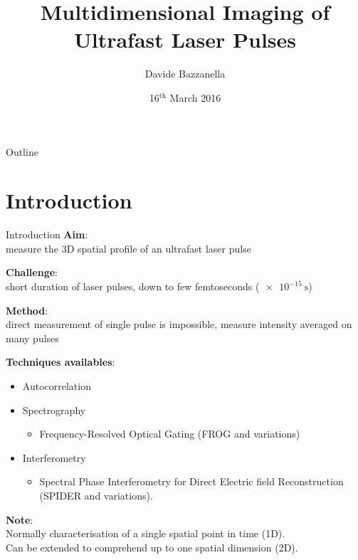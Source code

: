 \documentclass[11pt]{beamer}
\author{Davide Bazzanella}
\title{Multidimensional Imaging of Ultrafast Laser Pulses}
\institute{Imperial College London}
\date{16$^{\mathrm{th}}$ March 2016}
\begin{document}
\begin{frame}
\titlepage
\end{frame}

\begin{frame}{Outline}
\tableofcontents
\end{frame}

\section{Introduction}
\begin{frame}{Introduction}
\textbf{Aim}:\\
	measure the 3D spatial profile of an ultrafast laser pulse

	\vspace{15pt}
\textbf{Challenge}:\\
	short duration of laser pulses, down to few femtoseconds ($\SI{e-15}{\s}$)
	
	\vspace{15pt}
\textbf{Method}:\\
	direct measurement of single pulse is impossible,
	measure intensity averaged on many pulses
\end{frame}

\begin{frame}

\textbf{Techniques availables}:\\
\begin{itemize}
\item Autocorrelation
\item Spectrography
\begin{itemize}
\item Frequency-Resolved Optical Gating (FROG and variations)
\end{itemize}
\item Interferometry
\begin{itemize}
\item Spectral Phase Interferometry for Direct Electric field Reconstruction (SPIDER and variations).
\end{itemize}
\end{itemize}	

\textbf{Note}:\\
Normally characterisation of a single spatial point in time (1D).\\
Can be extended to comprehend up to one spatial dimension (2D).

\end{frame}
\end{document}
